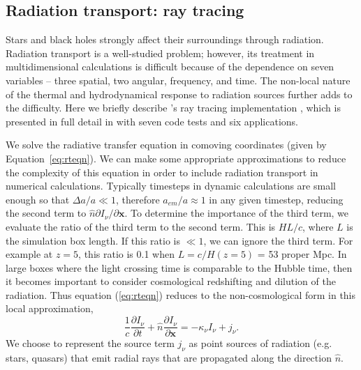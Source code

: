 \subsection{Radiation transport: ray tracing}
\label{sec.num.raytracing}

Stars and black holes strongly affect their surroundings through
radiation.  Radiation transport is a well-studied problem; however,
its treatment in multidimensional calculations is difficult because of
the dependence on seven variables -- three spatial, two angular,
frequency, and time.  The non-local nature of the thermal and
hydrodynamical response to radiation sources further adds to the
difficulty.  Here we briefly describe \enzo's ray tracing
implementation \moray, which is presented in full detail in
\citet{Wise11_Moray} with seven code tests and six applications.

We solve the radiative transfer equation in comoving coordinates
(given by Equation~\ref{eq:rteqn}).  We can make some appropriate
approximations to reduce the complexity of this equation in order to
include radiation transport in numerical calculations.  Typically
timesteps in dynamic calculations are small enough so that $\Delta a/a
\ll 1$, therefore $a_{em}/a \approx 1$ in any given timestep, reducing
the second term to $\hat{n} \partial I_\nu/\partial \mathbf{x}$.  To
determine the importance of the third term, we evaluate the ratio of
the third term to the second term.  This is $HL/c$, where $L$ is the
simulation box length.  If this ratio is $\ll 1$, we can ignore the
third term.  For example at $z=5$, this ratio is 0.1 when $L =
c/H(z=5)$ = 53 proper Mpc.  In large boxes where the light crossing
time is comparable to the Hubble time, then it becomes important to
consider cosmological redshifting and dilution of the radiation.  Thus
equation (\ref{eq:rteqn}) reduces to the non-cosmological form in this
local approximation,
%
\begin{equation}
  \frac{1}{c} \frac{\partial I_\nu}{\partial t} + 
  \hat{n} \frac{\partial I_\nu}{\partial \mathbf{x}} =
  -\kappa_\nu I_\nu + j_\nu .
\end{equation}
%
We choose to represent the source term $j_\nu$ as point sources of
radiation (e.g. stars, quasars) that emit radial rays that are
propagated along the direction $\hat{n}$.

